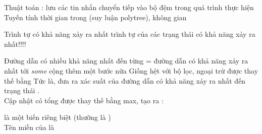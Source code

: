 \documentclass{article}
\begin{document}
\begin{huge}
\vspace*{0.01in}

\textwidth
{}

Thuật toán : lưu các tin nhắn chuyển tiếp vào bộ đệm trong quá trình thực hiện \\
Tuyến tính thời gian trong  (suy luận polytree), không gian 




Trình tự có khả năng xảy ra nhất \mat{$\neq$} trình tự của các trạng thái có khả năng xảy ra nhất!!!!

Đường dẫn có nhiều khả năng nhất đến từng  \al
  = đường dẫn có khả năng xảy ra nhất tới \emph{some}  cộng thêm một bước nữa
Giống hệt với bộ lọc, ngoại trừ  được thay thế bằng
\mat{\[ 
  \m_{1:t} = \max_{\sx_1\ldots\sx_{t-1}} \pv(\x_1,\ldots,\x_{t-1},\X_t | \e_{1:t}),
\]}
Tức là,  đưa ra xác suất của đường dẫn có khả năng xảy ra nhất đến trạng thái .\\
Cập nhật có tổng được thay thế bằng max, tạo ra :
\mat{\[
  \m_{1:t+1} = \pv(\e_{t+1} | \X_{t+1})  \max_{\sx_t}\left(
            \pv(\X_{t+1} | \x_t) \m_{1:t}\right)
\]}



\vspace{0.3in}

\textwidth
{}



 là một biến riêng biệt (thường là )\\
Tên miền của  là 


\end{huge}
\end{document}
